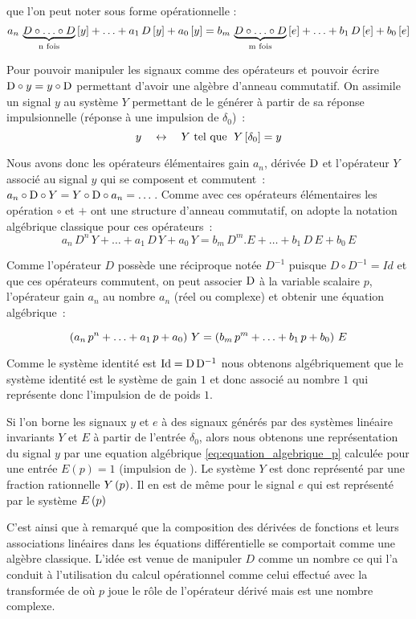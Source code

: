 que l'on peut noter sous forme opérationnelle :
$$
a_n\,\underbrace{D\circ\ldots\circ D}_{\text{n fois}}\left[y\right] + \ldots +a_1\,
D\left[y\right] + a_0\left[y\right] = b_m\,\underbrace{D\circ\ldots\circ D}_{\text{m fois}}\left[e\right] + \ldots +b_1\,
D\left[e\right] + b_0\left[e\right]
$$

Pour pouvoir manipuler les signaux comme des opérateurs et pouvoir
écrire $\mathrm{D}\circ y= y\circ\mathrm{D}$ permettant d'avoir une algèbre
d'anneau commutatif. On assimile un signal $y$ au système $Y$
permettant de le générer à partir de sa réponse impulsionnelle
(réponse à une impulsion de \Dirac{} $\delta_0$)~:
$$
y \quad\leftrightarrow\quad Y \text{ tel que } \; Y\left[\delta_0\right]=y
$$

Nous avons donc les opérateurs élémentaires gain $a_n$, dérivée $\mathrm{D}$
et l'opérateur $Y$ associé au signal $y$ qui se composent et
commutent~: $a_n\circ\mathrm{D}\circ Y = Y\circ\mathrm{D}\circ a_n =
\dots$. Comme avec ces opérateurs élémentaires les opération $\circ$
et $+$ ont une structure d'anneau commutatif, on adopte la notation
algébrique classique pour ces opérateurs~:
$$
a_n\,D^n\,Y + \ldots +a_1\, D \, Y + a_0 \,Y = b_m\,D^m.E + \ldots +b_1\, D\, E + b_0 \,E
$$

Comme l'opérateur $D$ possède une réciproque notée $D^{-1}$ puisque
$D\circ D^{-1}= Id$ et que ces opérateurs commutent, on peut associer
$\mathrm{D}$ à la variable scalaire $p$, l'opérateur gain $a_n$ au nombre
$a_n$ (réel ou complexe) et obtenir une équation algébrique~:

\begin{equation}
  \left(a_n\,p^n + \ldots +a_1\, p + a_0 \right)\, Y = \left(b_m\,p^m + \ldots +b_1\, p + b_0 \right)\,E
  \label{eq:equation_algebrique_p}
\end{equation}

Comme le système identité est $\mathrm{Id}=\mathrm{D}\,\mathrm{D}^{-1}$ nous obtenons
algébriquement que le système identité est le système de gain $1$ et
donc associé au nombre $1$ qui représente donc l'impulsion de \Dirac{}
de poids $1$.

Si l'on borne les signaux $y$ et $e$ à des signaux générés par des
systèmes linéaire invariants $Y$ et $E$ à partir de l'entrée
$\delta_0$, alors nous obtenons une représentation du signal $y$ par
une equation algébrique \eqref{eq:equation_algebrique_p} calculée pour
une entrée $E(p)=1$ (impulsion de \Dirac{}). Le système $Y$ est donc
représenté par une fraction rationnelle $Y\left(p\right)$. Il en est de même
pour le signal $e$ qui est représenté par le système $E\left(p\right)$

C'est ainsi que \Heaviside{} à remarqué que la composition des
dérivées de fonctions et leurs associations linéaires dans les
équations différentielle se comportait comme une algèbre
classique. L'idée est venue de manipuler $D$ comme un nombre ce qui
l'a conduit à l'utilisation du calcul opérationnel comme celui
effectué avec la transformée de \Laplace{} où $p$ joue le rôle de
l'opérateur dérivé mais est une nombre complexe.

